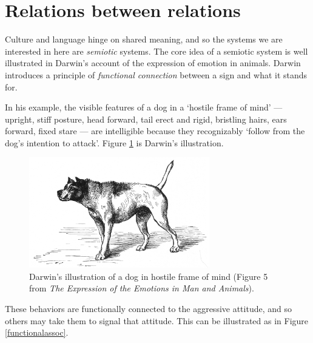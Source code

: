 

\section{Relations between relations}

Culture and language hinge on shared meaning, and so the systems we are interested in here are \textit{semiotic }systems. The core idea of a semiotic system 
is well illustrated in Darwin's account of the expression of emotion in 
animals. Darwin introduces a principle of \textit{functional connection 
}between a sign and what it stands for. 



In his example, the visible features of a dog in a \textquoteleft hostile frame of 
mind' --- upright, stiff posture, head forward, tail erect and rigid, 
bristling hairs, ears forward, fixed stare --- are intelligible because they 
recognizably \textquoteleft follow from the dog's intention to attack'. Figure \ref{darwin1} is 
Darwin's illustration.


\begin{figure}[h]
\includegraphics[width=0.70\textwidth,keepaspectratio]{figures/Fig01}
\caption{Darwin's illustration of a dog in hostile frame of mind 
(Figure 5 from \textit{The Expression of the Emotions in Man and 
Animals}).}
\label{darwin1}
\end{figure}



These behaviors are functionally connected to the aggressive attitude, 
and so others may take them to signal that attitude. This can be illustrated as in Figure \ref{functionalassoc}.

